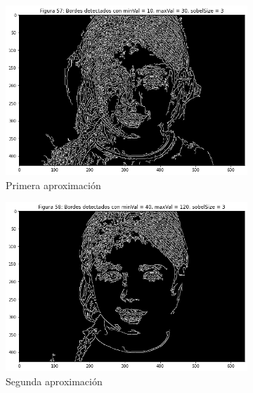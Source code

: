 \documentclass[11pt,twoside,titlepage,a4paper]{article}
\numberwithin{equation}{section} %
\theoremstyle{usual}
\begin{document}
\begin{figure}[h]
    \centering
    \begin{subfigure}[b]{.3\textwidth}
        \centering
        \includegraphics[width=\textwidth]{imagenes/PoissonImageEditing_cell_70_output_0.png}
        \caption{Primera aproximación}
        \label{fig:1Aprox}
    \end{subfigure}%
    \centering
    \begin{subfigure}[b]{.3\textwidth}
        \centering
        \includegraphics[width=\textwidth]{imagenes/PoissonImageEditing_cell_70_output_1.png}
        \caption{Segunda aproximación}
        \label{fig:2Aprox}
    \end{subfigure}%
    \centering
    \begin{subfigure}[b]{.3\textwidth}
        \centering

\end{subfigure}
\end{figure}
\end{document}
